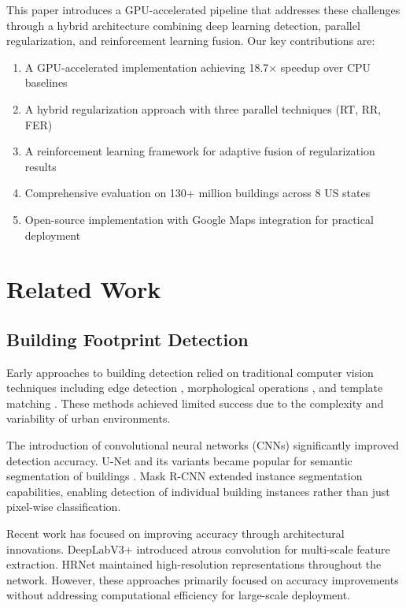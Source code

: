\documentclass{article}
\begin{document}
This paper introduces a GPU-accelerated pipeline that addresses these challenges through a hybrid architecture combining deep learning detection, parallel regularization, and reinforcement learning fusion. Our key contributions are:

\begin{enumerate}
\item A GPU-accelerated implementation achieving 18.7× speedup over CPU baselines
\item A hybrid regularization approach with three parallel techniques (RT, RR, FER)
\item A reinforcement learning framework for adaptive fusion of regularization results  
\item Comprehensive evaluation on 130+ million buildings across 8 US states
\item Open-source implementation with Google Maps integration for practical deployment
\end{enumerate}

\section{Related Work}

\subsection{Building Footprint Detection}

Early approaches to building detection relied on traditional computer vision techniques including edge detection \cite{tournaire2007efficient}, morphological operations \cite{huang2014building}, and template matching \cite{ok2013automated}. These methods achieved limited success due to the complexity and variability of urban environments.

The introduction of convolutional neural networks (CNNs) significantly improved detection accuracy. U-Net \cite{ronneberger2015u} and its variants became popular for semantic segmentation of buildings \cite{maggiori2017convolutional}. Mask R-CNN \cite{he2017mask} extended instance segmentation capabilities, enabling detection of individual building instances rather than just pixel-wise classification.

Recent work has focused on improving accuracy through architectural innovations. DeepLabV3+ \cite{chen2018encoder} introduced atrous convolution for multi-scale feature extraction. HRNet \cite{sun2019deep} maintained high-resolution representations throughout the network. However, these approaches primarily focused on accuracy improvements without addressing computational efficiency for large-scale deployment.
\end{document}
